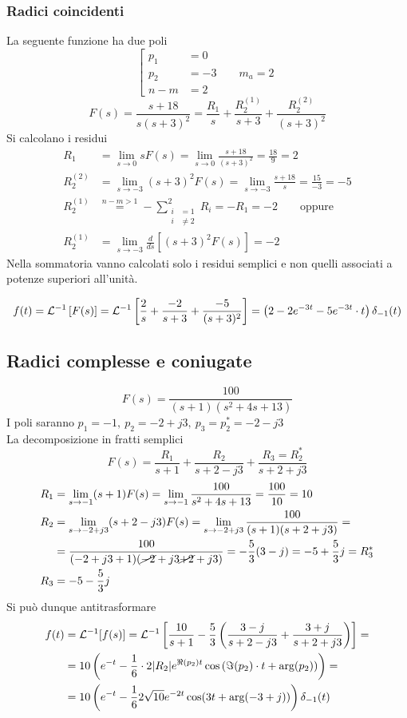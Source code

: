 \subsubsection{Radici coincidenti}
La seguente funzione ha due poli
$$
\left[\begin{aligned}
p_1 &= 0\\
p_2 &= -3 \qquad m_a=2\\
n-m &=2
\end{aligned}\right.
$$
$$
F(s) = \frac{s+18}{s(s+3)^2} = \frac{R_1}{s} + \frac{R_2^{(1)}}{s+3} +
\frac{R_2^{(2)}}{(s+3)^2}
$$
Si calcolano i residui
$$\begin{aligned}
R_1 &= \lim_{s\to 0} sF(s) = \lim_{s\to 0} \frac{s+18}{(s+3)^2} = \frac{18}{9}
= 2\\
R_2^{(2)} &= \lim_{s\to -3} (s+3)^2 F(s) =
\lim_{s\to -3} \frac{s+18}{s} = \frac{15}{-3} = -5\\
R_2^{(1)} &\stackrel{n-m>1}{=} -\sum_{\begin{aligned}
i&=1\\ i &\neq 2
\end{aligned}}^2 R_i = -R_1 = -2 \qquad \text{oppure}\\
R_2^{(1)} & = \lim_{s\to -3} \frac{d}{ds} \left[(s+3)^2F(s)\right] = -2
\end{aligned}$$
Nella sommatoria vanno calcolati solo i residui semplici e non quelli associati
a potenze superiori all'unità.

$$
f(t) = \mathcal{L}^{-1}\left[F(s)\right] = \mathcal{L}^{-1} \left[\frac{2}{s} +
\frac{-2}{s+3} + \frac{-5}{(s+3)^2}\right] =
\left(2-2e^{-3t} -5e^{-3t}\cdot t\right)\delta_{-1}(t)
$$

\newpage
\subsection{Radici complesse e coniugate}
\label{radici_complesse_coniugate_tempo}
$$
F(s) = \frac{100}{(s+1)(s^2 + 4s + 13)}
$$
I poli saranno $p_1 = -1,\ p_2 = -2+j3,\ p_3 = p_2^* = -2-j3 $\\
La decomposizione in fratti semplici
$$
F(s) = \frac{R_1}{s+1} + \frac{R_2}{s+2-j3} + \frac{R_3=R_2^*}{s+2+j3}
$$
$$\begin{aligned}
R_1 &= \lim_{s\to -1} (s+1)F(s) = \lim_{s\to -1}\frac{100}{s^2+4s +13} =
\frac{100}{10} = 10\\
R_2 &= \lim_{s\to -2+j3} (s+2-j3)F(s) =\lim_{s\to -2+j3}
\frac{100}{(s+1)(s+2+j3)} = \\
&=\frac{100}{(-2 + j3 + 1)(\cancel{-2}+j3 \cancel{+
2} + j3)} = -\frac{5}{3}(3-j) = -5 + \frac{5}{3}j=R_3^*\\
R_3 &= -5 - \frac{5}{3}j
\end{aligned}$$
Si può dunque antitrasformare
$$\begin{aligned}
f(t) &= \mathcal{L}^{-1} [f(s)] = \mathcal{L}^{-1}
\left[
\frac{10}{s+1} - \frac{5}{3}\left(
\frac{3-j}{s+2-j3}+ \frac{3+j}{s+2+j3}
\right)
\right] = \\
&=10\left(e^{-t} -\frac{1}{6}\cdot
2|R_2|e^{\Re(p_2)t}\cos\left(\Im(p_2)\cdot t + \text{arg}(p_2)\right)
\right) = \\
&= 10\left(e^{-t} -\frac{1}{6}2\sqrt{10}e^{-2t} \cos(3t+
\text{arg}(-3+j))\right)\delta_{-1}(t)
\end{aligned}$$

